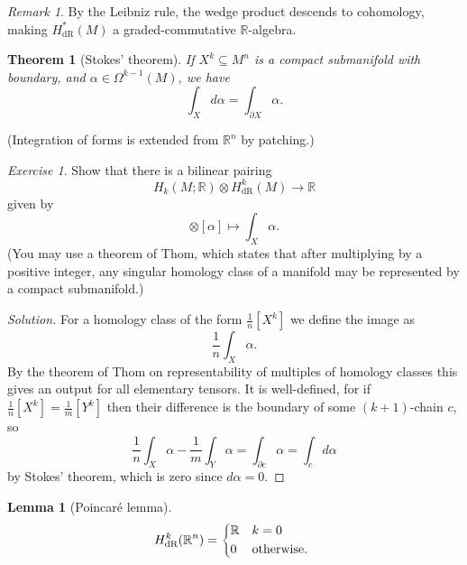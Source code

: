 \documentclass[a4paper]{article}
\newtheorem*{theorem}{Theorem}
\newtheorem*{lemma}{Lemma}
\theoremstyle{definition}
\theoremstyle{remark}
\newtheorem*{remark}{Remark}
\newtheorem*{exercise}{Exercise}
\newcommand{\dR}{\text{dR}}
\newcommand{\R}{\mathbb{R}}
\begin{document}
\begin{remark}
    By the Leibniz rule, the wedge product descends to cohomology, making
    $H^*_\dR(M)$ a graded-commutative $\R$-algebra.
\end{remark}

\begin{theorem}[Stokes' theorem]
    If $X^k\subseteq M^n$ is a compact submanifold with boundary, and
    $\alpha\in\Omega^{k-1}(M)$, we have
    \begin{equation*}
        \int_Xd\alpha = \int_{\partial X}\alpha.
    \end{equation*}
\end{theorem}

(Integration of forms is extended from $\R^n$ by patching.)

\begin{exercise}
    Show that there is a bilinear pairing
    \begin{equation*}
        H_k(M;\R)\otimes H^k_\dR(M)\to\R
    \end{equation*}
    given by
    \begin{equation*}
        [X^k]\otimes[\alpha]\mapsto\int_X\alpha.
    \end{equation*}
    (You may use a theorem of Thom, which states that after multiplying by a
    positive integer, any singular homology class of a manifold may be
    represented by a compact submanifold.)
\end{exercise}

\begin{proof}[Solution]
    For a homology class of the form $\frac{1}{n}[X^k]$ we define the image as
    \begin{equation*}
        \frac{1}{n}\int_X\alpha.
    \end{equation*}
    By the theorem of Thom on representability of multiples of homology classes
    this gives an output for all elementary tensors. It is well-defined, for if
    $\frac{1}{n}[X^k]=\frac{1}{m}[Y^k]$ then their difference is the boundary of
    some $(k+1)$-chain $c$, so
    \begin{equation*}
        \frac{1}{n}\int_X\alpha - \frac{1}{m}\int_Y\alpha
            = \int_{\partial c}\alpha
            = \int_cd\alpha
    \end{equation*}
    by Stokes' theorem, which is zero since $d\alpha=0$.
\end{proof}

\begin{lemma}[Poincar\'e lemma]
    \begin{equation*}
        H^k_\dR(\R^n) = \begin{dcases*}
            \R & $k=0$ \\
            0 & otherwise.
        \end{dcases*}
    \end{equation*}
\end{lemma}
\end{document}
